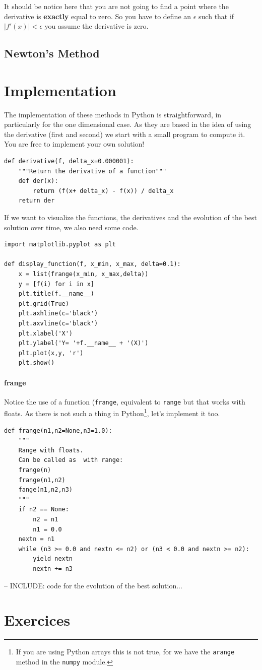 It should be notice here that you are not going to find a point where the derivative is \textbf{exactly} equal to zero. So you have to define an $\epsilon$ such that if $ |f'(x)| < \epsilon$ you assume the derivative is zero.


\subsection{Newton's Method}

\section{Implementation}

The implementation of these methods in Python is straightforward, in particularly for the one dimensional case.  As they are based in the idea of using the derivative (first and second) we start with a small program to compute it.  You are free to implement your own solution!

\begin{lstlisting}
def derivative(f, delta_x=0.000001):
    """Return the derivative of a function"""
    def der(x):
        return (f(x+ delta_x) - f(x)) / delta_x
    return der
\end{lstlisting}

If we want to visualize the functions, the derivatives and the evolution of the best solution over time, we also need some code.

\begin{lstlisting}
import matplotlib.pyplot as plt

def display_function(f, x_min, x_max, delta=0.1):
    x = list(frange(x_min, x_max,delta))
    y = [f(i) for i in x]
    plt.title(f.__name__)
    plt.grid(True)
    plt.axhline(c='black')
    plt.axvline(c='black')    
    plt.xlabel('X')
    plt.ylabel('Y= '+f.__name__ + '(X)')
    plt.plot(x,y, 'r')
    plt.show()
\end{lstlisting}

\paragraph{frange}Notice the use of a function (\texttt{frange}, equivalent to  \texttt{range} but that works with floats. As there is not such a thing in Python\footnote{If you are using Python arrays this is not true, for we have the \texttt{arange} method in the \texttt{numpy} module.}, let's implement it too.

\begin{lstlisting}
def frange(n1,n2=None,n3=1.0):
    """
    Range with floats.
    Can be called as  with range:
    frange(n)
    frange(n1,n2)
    fange(n1,n2,n3)
    """
    if n2 == None:
        n2 = n1
        n1 = 0.0
    nextn = n1
    while (n3 >= 0.0 and nextn <= n2) or (n3 < 0.0 and nextn >= n2):
        yield nextn
        nextn += n3
\end{lstlisting}


-- INCLUDE: code for the evolution of the best solution...\\


\section{Exercices}